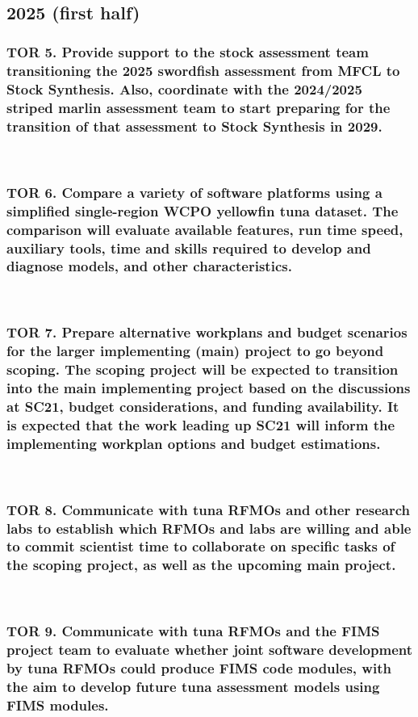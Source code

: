 \documentclass{SCreport}
\begin{document}
~

\subsection{2025 (first half)}

\subsubsection{TOR 5. Provide support to the stock assessment team transitioning
  the 2025 swordfish assessment from MFCL to Stock Synthesis. Also, coordinate
  with the 2024/2025 striped marlin assessment team to start preparing for the
  transition of that assessment to Stock Synthesis in 2029.}

~

\subsubsection{TOR 6. Compare a variety of software platforms using a simplified
  single-region WCPO yellowfin tuna dataset. The comparison will evaluate
  available features, run time speed, auxiliary tools, time and skills required
  to develop and diagnose models, and other characteristics.}

~

\subsubsection{TOR 7. Prepare alternative workplans and budget scenarios for the
  larger implementing (main) project to go beyond scoping. The scoping project
  will be expected to transition into the main implementing project based on the
  discussions at SC21, budget considerations, and funding availability. It is
  expected that the work leading up SC21 will inform the implementing workplan
  options and budget estimations.}

~

\subsubsection{TOR 8. Communicate with tuna RFMOs and other research labs to
  establish which RFMOs and labs are willing and able to commit scientist time
  to collaborate on specific tasks of the scoping project, as well as the
  upcoming main project.}

~

\subsubsection{TOR 9. Communicate with tuna RFMOs and the FIMS project team to
  evaluate whether joint software development by tuna RFMOs could produce FIMS
  code modules, with the aim to develop future tuna assessment models using FIMS
  modules.}
\end{document}
